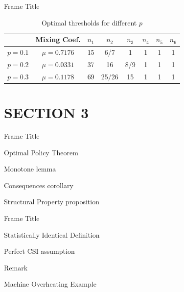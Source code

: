 \documentclass[notheorems, aspectratio=169]{beamer}
\begin{document}
\begin{frame}{Frame Title}
\begin{table}[htbp]
\renewcommand{\arraystretch}{1.2}
\centering
\caption{Optimal thresholds for different $p$}
\begin{tabular}{c|c|c|c|c|c|c|c}
    \hline
    & Mixing Coef. & $n_1$ & $n_2$ & $n_3$ & $n_4$ & $n_5$ & $n_6$\\
    \hline
    \hline
    $p=0.1$ & $\mu=0.7176$ & 15 & 6/7 & 1 & 1 & 1 & 1\\ 
    \hline
    $p=0.2$ & $\mu=0.0331$ & 37 & 16 & 8/9 & 1 & 1 & 1\\ 
    \hline
    $p=0.3$ & $\mu=0.1178$ & 69 & 25/26 & 15 & 1 & 1 & 1\\ 
    \hline
\end{tabular}
\end{table}
\end{frame}

\section{SECTION 3}

\begin{frame}
\begin{center}
\textbf{\tableofcontents[currentsection]}
\end{center}
\end{frame}

\begin{frame}{Frame Title}
\begin{theorem}[label = {theo-test1}]{Optimal Policy}
Theorem
\end{theorem}
\begin{lemma}[label = {lem-test1}]{Monotone}
lemma
\end{lemma}
\pause
\begin{corollary}[label = {cor-test1}]{Consequences}
corollary
\end{corollary}
\begin{proposition}[label = {prop-test1}]{Structural Property}
proposition
\end{proposition}
\end{frame}

\begin{frame}{Frame Title}
\begin{definition}{Statistically Identical}
Definition
\end{definition}
\begin{assumption}{Perfect CSI}
assumption
\end{assumption}
\pause
\begin{remark}
Remark
\end{remark}
\begin{example}{Machine Overheating}
Example
\end{example}
\end{frame}
\end{document}

